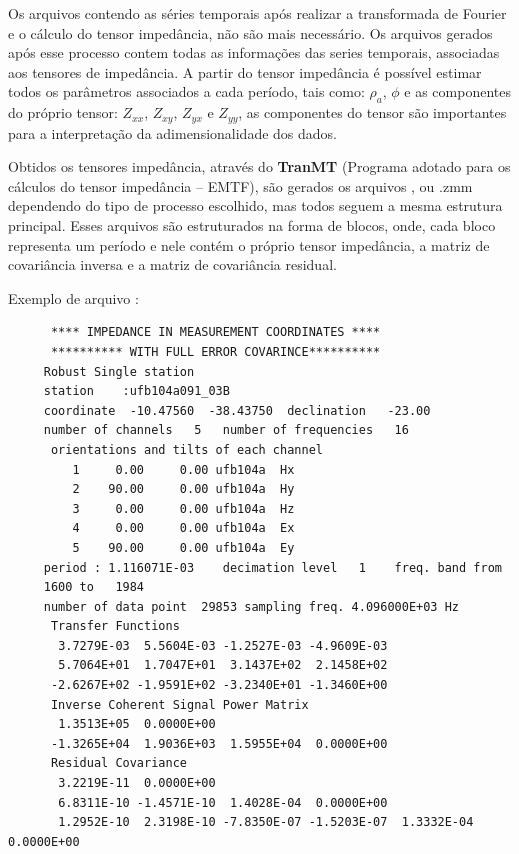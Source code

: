         Os arquivos contendo as séries temporais após realizar a transformada de Fourier e o cálculo do tensor impedância, não são mais necessário. Os arquivos gerados após esse processo contem todas as informações das series temporais, associadas aos tensores de impedância. A partir do tensor impedância é possível estimar todos os parâmetros associados a cada período, tais como: $\rho_a$, $\phi$ e as componentes do próprio tensor: $Z_{xx}$, $Z_{xy}$, $Z_{yx}$ e $Z_{yy}$, as componentes do tensor são importantes para a interpretação da adimensionalidade dos dados.
        
        Obtidos os tensores impedância, através do \textbf{TranMT} (Programa adotado para os cálculos do tensor impedância -- EMTF), são gerados os arquivos ,  ou {.zmm} dependendo do tipo de processo escolhido, mas todos seguem a mesma estrutura principal. Esses arquivos são estruturados na forma de blocos, onde, cada bloco representa um período e nele contém o próprio tensor impedância, a matriz de covariância inversa e a matriz de covariância residual.
        
        Exemplo de arquivo :
        
\begin{footnotesize}        
\begin{verbatim}
      **** IMPEDANCE IN MEASUREMENT COORDINATES ****
      ********** WITH FULL ERROR COVARINCE**********
     Robust Single station                                                           
     station    :ufb104a091_03B      
     coordinate  -10.47560  -38.43750  declination   -23.00
     number of channels   5   number of frequencies   16
      orientations and tilts of each channel 
         1     0.00     0.00 ufb104a  Hx    
         2    90.00     0.00 ufb104a  Hy    
         3     0.00     0.00 ufb104a  Hz    
         4     0.00     0.00 ufb104a  Ex    
         5    90.00     0.00 ufb104a  Ey    
     period : 1.116071E-03    decimation level   1    freq. band from
     1600 to   1984
     number of data point  29853 sampling freq. 4.096000E+03 Hz
      Transfer Functions
       3.7279E-03  5.5604E-03 -1.2527E-03 -4.9609E-03
       5.7064E+01  1.7047E+01  3.1437E+02  2.1458E+02
      -2.6267E+02 -1.9591E+02 -3.2340E+01 -1.3460E+00
      Inverse Coherent Signal Power Matrix
       1.3513E+05  0.0000E+00
      -1.3265E+04  1.9036E+03  1.5955E+04  0.0000E+00
      Residual Covariance
       3.2219E-11  0.0000E+00
       6.8311E-10 -1.4571E-10  1.4028E-04  0.0000E+00
       1.2952E-10  2.3198E-10 -7.8350E-07 -1.5203E-07  1.3332E-04  0.0000E+00                                     
\end{verbatim}
\end{footnotesize}
        

